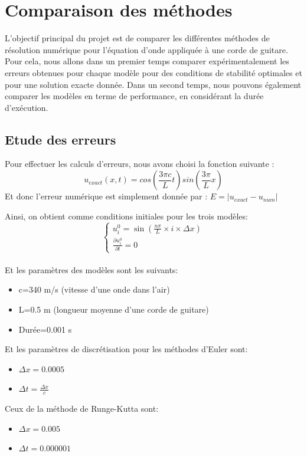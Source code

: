 \section{Comparaison des méthodes}
L'objectif principal du projet est de comparer les différentes méthodes de résolution numérique pour l'équation d'onde appliquée à une corde de guitare.
Pour cela, nous allons dans un premier temps comparer expérimentalement les erreurs obtenues pour chaque modèle pour des conditions de stabilité optimales et pour une solution exacte donnée.
Dans un second temps, nous pouvons également comparer les modèles en terme de performance, en considérant la durée d'exécution.

\subsection{Etude des erreurs}
Pour effectuer les calculs d'erreurs, nous avons choisi la fonction suivante :
\begin{equation*}
    u_{exact}(x,t)=cos(\frac{3 \pi c}{L}t)sin(\frac{3 \pi }{L}x )
\end{equation*}
Et donc l'erreur numérique est simplement donnée par :
     $E=|u_{exact} - u_{num}|$

Ainsi, on obtient comme conditions initiales pour les trois modèles:
  \[
      \begin{cases}
        u^{0}_{i}=\sin(\frac{n \pi }{L} \times i \times \Delta x) \\
        \frac{\partial u^0_{i}}{\partial t}= 0
      \end{cases}
    \]\\
Et les paramètres des modèles sont les suivants:
\begin{itemize}
    \item c=340 m/s (vitesse d'une onde dans l'air)
    \item L=0.5 m (longueur moyenne d'une corde de guitare)
    \item Durée=0.001 s\\ 
\end{itemize}
Et les paramètres de discrétisation pour les méthodes d'Euler sont:
\begin{itemize}
    \item $\Delta x=0.0005$
    \item $\Delta t=\frac{\Delta x}{c}$
\end{itemize}
Ceux de la méthode de Runge-Kutta sont: 
\begin{itemize}
    \item $\Delta x=0.005$
    \item $\Delta t=0.000001$
\end{itemize}

